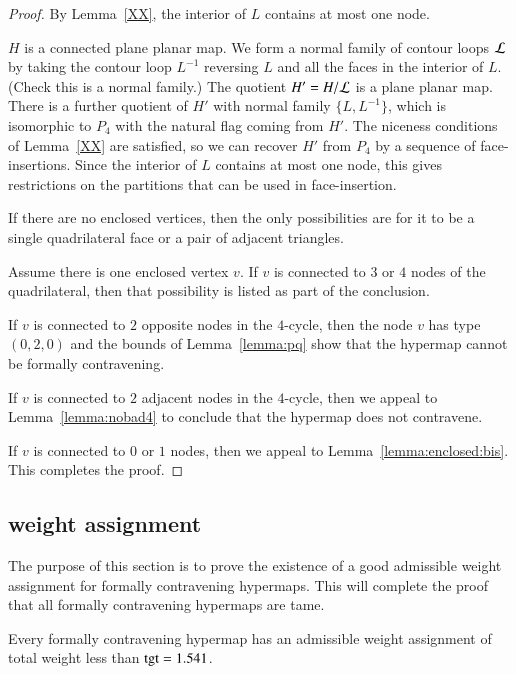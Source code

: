 \begin{proof}
By Lemma~\ref{XX}, the interior of $L$ contains at most one node.

$H$ is a connected plane planar map.  We form a normal family of
contour loops ${\cal L}$ by taking the contour loop $L^{-1}$
reversing $L$ and all the faces in the interior of $L$.
(Check this is a normal family.)  The quotient $H' = H/{\cal L}$ is
a plane planar map.  There is a further quotient of $H'$ with normal
family $\{L,L^{-1}\}$, which is isomorphic to $P_4$ with the natural
flag coming from $H'$.  The niceness conditions of Lemma~\ref{XX} are
satisfied, so we can recover $H'$ from $P_4$ by a sequence of
face-insertions.  Since the interior of $L$ contains at most one
node, this gives restrictions on the partitions that can be used in
face-insertion.

If there are no enclosed vertices, then the only possibilities are
for it to be a single quadrilateral face or a pair of adjacent
triangles.

Assume there is one enclosed vertex $v$.  If $v$ is connected to $3$
or $4$ nodes of the quadrilateral, then that possibility is listed
as part of the conclusion.

If $v$ is connected to $2$ opposite nodes in the $4$-cycle, then the
node $v$ has type $(0,2,0)$ and the bounds of
Lemma~\ref{lemma:pq} show that the hypermap cannot be formally
contravening.

If $v$ is connected to $2$ adjacent nodes in the $4$-cycle, then we
appeal to Lemma~\ref{lemma:nobad4} to conclude that the hypermap
does not contravene.

If $v$ is connected to $0$ or $1$ nodes, then we appeal to
Lemma~\ref{lemma:enclosed:bis}.  This completes the proof.
\end{proof}


\subsection{weight assignment}
    \label{sec:weight}

The purpose of this section is to prove the existence of a good
admissible weight assignment for formally contravening hypermaps.
This will complete the proof that all formally contravening
hypermaps are tame.

\begin{theorem}  Every formally contravening hypermap has an admissible
weight assignment of total weight less than ${\operatorname{tgt}}=1.541$.
\end{theorem}

